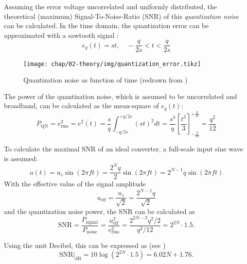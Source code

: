 Assuming the error voltage uncorrelated and uniformly distributed, the theoretical (maximum) Signal-To-Noise-Ratio (SNR) of this \textit{quantization noise} can be calculated. In the time domain, the quantization error can be approximated with a sawtooth signal \cite{walt}:
\begin{equation}
e_q(t) = st, \quad -\frac{q}{2s} < t < \frac{q}{2s} 
\end{equation}

\begin{figure}[tbh]
	\centering
	\texttt{[image: chap/02-theory/img/quantization\_error.tikz]}
	\caption{Quantization noise as function of time (redrawn from \cite{walt})}
	\label{fig:eq}
\end{figure}


The power of the quantization noise, which is assumed to be uncorrelated and broadband, can be calculated as the mean-square of $e_q(t)$:
\begin{equation}
P_\text{QN} = e_{\text{rms}}^{2} = \overline{e^{2}(t)} = \frac{s}{q}\int_{-q/2s}^{+q/2s} (st)^{2} dt = \frac{s^3}{q} \left[ \frac{t^3}{3}\right]_{-\frac{q}{2s}}^{+\frac{q}{2s}} = \frac{q^2}{12}
\end{equation}

To calculate the maximal SNR of an ideal converter, a full-scale input sine wave is assumed:
\begin{equation}
u(t) = u_s \sin(2\pi f t) = \frac{2^{N}q}{2}\sin(2\pi f t)  = 2^{N-1}q \sin(2\pi f t)
\end{equation}
With the effective value of the signal amplitude
\begin{equation}
u_{\text{eff}} = \frac{u_s}{\sqrt{2}} = \frac{2^{N-1}q}{\sqrt{2}}
\end{equation}
and the quantization noise power, the SNR can be calculated as
\begin{equation}
\text{SNR} = \frac{P_{\text{signal}}}{P_{\text{noise}}} = \frac{u_{\text{eff}}^{2}}{e_{\text{rms}}^{2}} = \frac{2^{2N-2}q^2/2}{q^2/12} = 2^{2N} \cdot 1.5.
\end{equation}

Using the unit Decibel, this can be expressed as (see \cite{puente2015,walt})
\begin{equation}
\text{SNR}|_{\text{dB}} = 10\log\left(2^{2N}\cdot 1.5\right) = 6.02 N + 1.76.
\end{equation}









